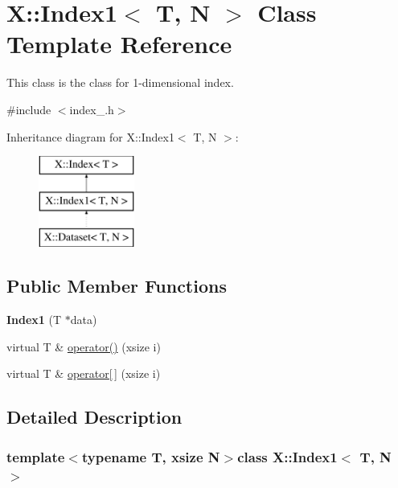 \hypertarget{class_x_1_1_index1}{\section{X\-:\-:Index1$<$ T, N $>$ Class Template Reference}
\label{class_x_1_1_index1}
}


This class is the class for 1-\/dimensional index.  




{\ttfamily \#include $<$index\-\_.\-h$>$}

Inheritance diagram for X\-:\-:Index1$<$ T, N $>$\-:\begin{figure}[H]
\begin{center}
\leavevmode
\includegraphics[height=3.000000cm]{class_x_1_1_index1}
\end{center}
\end{figure}
\subsection*{Public Member Functions}
\begin{DoxyCompactItemize}
\item 
\hypertarget{class_x_1_1_index1_a1a3384046f034e8c7abb66f33e06872d}{{\bfseries Index1} (T $\ast$data)}\label{class_x_1_1_index1_a1a3384046f034e8c7abb66f33e06872d}

\item 
virtual T \& \hyperlink{class_x_1_1_index1_a2d876d68fd4b7248660909862d2fd66b}{operator()} (xsize i)
\item 
virtual T \& \hyperlink{class_x_1_1_index1_af340b1faa1a33473a9a1f972e1a2f7a1}{operator\mbox{[}$\,$\mbox{]}} (xsize i)
\end{DoxyCompactItemize}


\subsection{Detailed Description}
\subsubsection*{template$<$typename T, xsize N$>$class X\-::\-Index1$<$ T, N $>$}

